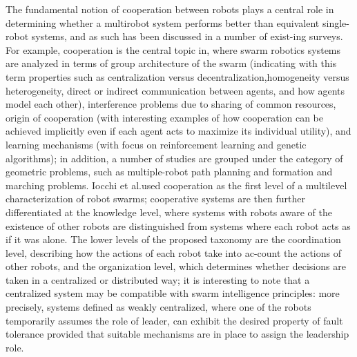 The fundamental notion of cooperation between robots plays a central role in determining whether a multirobot system performs better than equivalent single-robot systems, and as such has been discussed in a number of exist-ing surveys. For example, cooperation is the central topic in\cite{fourth}, where swarm robotics systems are analyzed in terms of group architecture of the swarm (indicating with this term properties such as centralization versus decentralization,homogeneity versus heterogeneity, direct or indirect communication between agents, and how agents model each other), interference problems due to sharing of common resources, origin of cooperation (with interesting examples of how cooperation can be achieved implicitly even if each agent acts to maximize its individual utility), and learning mechanisms (with focus on reinforcement learning and genetic algorithms); in addition, a number of studies are grouped under the category of geometric problems, such as multiple-robot path planning and formation and marching problems. Iocchi et al.\cite{sixth}used cooperation as the first level of a multilevel characterization of robot swarms; cooperative systems are then further differentiated at the knowledge level, where systems with robots aware of the existence of other robots are distinguished from systems where each robot acts as if it was alone. The lower levels of the proposed taxonomy are the coordination level, describing how the actions of each robot take into ac-count the actions of other robots, and the organization level, which determines whether decisions are taken in a centralized or distributed way; it is interesting to note that a centralized system may be compatible with swarm intelligence principles: more precisely, systems defined as weakly centralized, where one of the robots temporarily assumes the role of leader, can exhibit the desired property of fault tolerance provided that suitable mechanisms are in place to assign the leadership role.\\
